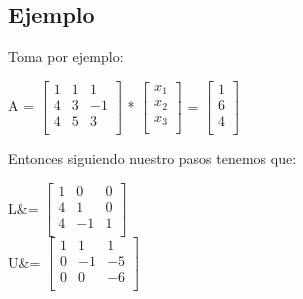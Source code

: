 \documentclass[12pt, fleqn]{report}                             %
\def \Eq {equation}                                             %
\newenvironment{MultiLineEquation*}[1]                          %
        {\begin{\Eq*}\begin{alignedat}{#1}}                         %
        {\end{alignedat}\end{\Eq*}}                                 %
\theoremstyle{break}                                            %
\newcommand{\bVector}[1]                                        %
        { \ensuremath{\begin{bmatrix}#1\end{bmatrix}} }             %
\newcommand{\Color}[2]{\textcolor{#1}{#2}}                      %
\newcommand \ColorMatrixA       {Teal700MD}                     %
\newcommand \ColorVecX          {Green700MD}                    %
\newcommand \ColorVecB          {Red700MD}                      %
\newcommand \ColorMatrixL       {Amber700MD}                    %
\newcommand \ColorMatrixU       {Indigo700MD}                   %
\newcommand \MatrixL      {\Color{\ColorMatrixL}{L}}            %
\newcommand \MatrixU      {\Color{\ColorMatrixU}{U}}            %
\begin{document}
            \clearpage
            \subsection{Ejemplo}

            Toma por ejemplo:
            \begin{MultiLineEquation*}{3}
                \Color{\ColorMatrixA}{
                    A =\bVector{
                        1 & 1 &  1   \\
                        4 & 3 & -1  \\
                        4 & 5 &  3   \\
                    } 
                }
                *
                \Color{\ColorVecX}{
                    \bVector{
                        x_1  \\
                        x_2  \\
                        x_3  \\
                    }
                }
                =
                \Color{\ColorVecB}{
                    \bVector{
                        1  \\
                        6  \\
                        4  \\
                    }
                }
            \end{MultiLineEquation*}

            Entonces siguiendo nuestro pasos tenemos que:
            \begin{MultiLineEquation*}{3}
                \MatrixL &= \Color{\ColorMatrixL}{\bVector{
                    1 & 0 & 0    \\
                    4 & 1 & 0    \\
                    4 & -1 & 1   \\
                }}
                \\
                \MatrixU &= \Color{\ColorMatrixU}{\bVector{
                    1 & 1  & 1    \\
                    0 & -1 & -5  \\
                    0 & 0  & -6   \\
                }}
            \end{MultiLineEquation*}
\end{document}
